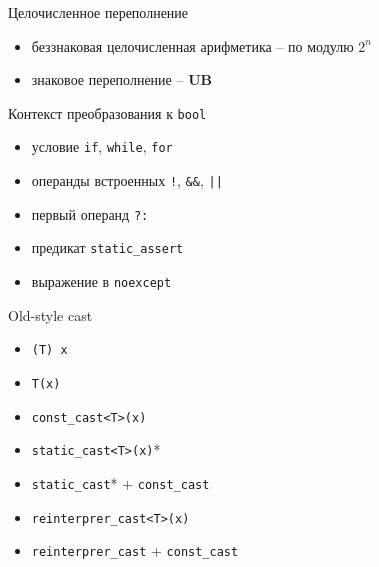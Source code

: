 \documentclass[unknownkeysallowed,xcolor=table]{beamer}
\begin{document}
\begin{frame}{Целочисленное переполнение}
  \begin{itemize}
    \item беззнаковая целочисленная арифметика -- по модулю $2^n$ \vspace{2em}
    \item знаковое переполнение -- \textbf{UB}
  \end{itemize}
\end{frame}

\begin{frame}[fragile]{Контекст преобразования к \lstinline{bool}}
  \begin{itemize}
    \item условие \lstinline{if}, \lstinline{while}, \lstinline{for} \vspace{1em}
    \item операнды встроенных \lstinline{!}, \lstinline{&&}, \lstinline{||} \vspace{1em}
    \item первый операнд \lstinline{?:} \vspace{1em}
    \item предикат \lstinline{static_assert} \vspace{1em}
    \item выражение в \lstinline{noexcept}
  \end{itemize}
\end{frame}

\begin{frame}[fragile]{Old-style cast}
  \begin{minipage}{.45\textwidth}
    \begin{itemize}
      \item \lstinline{(T) x}
      \item \lstinline{T(x)}
    \end{itemize}
  \end{minipage}\hfill
  \begin{minipage}{.45\textwidth}
    \begin{itemize}
      \item \lstinline{const_cast<T>(x)} \vspace{0.5em}
      \item \lstinline{static_cast<T>(x)}* \vspace{0.5em}
      \item \lstinline{static_cast}* + \lstinline{const_cast} \vspace{0.5em}
      \item \lstinline{reinterprer_cast<T>(x)}
      \item \lstinline{reinterprer_cast} + \lstinline{const_cast}
    \end{itemize}
  \end{minipage}
\end{frame}
\end{document}
